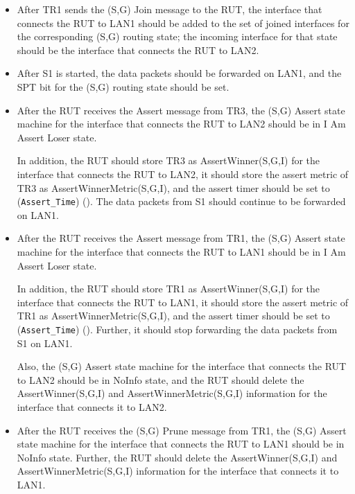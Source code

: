 \documentclass[11pt]{report}
\begin{document}
\begin{itemize}

  \item After TR1 sends the (S,G) Join message to the RUT, the interface that
  connects the RUT to LAN1 should be added to the set of joined interfaces for
  the corresponding (S,G) routing state; the incoming interface for that state
  should be the interface that connects the RUT to LAN2.

  \item After S1 is started, the data packets should be forwarded on LAN1,
  and the SPT bit for the (S,G) routing state should be set.

  \item After the RUT receives the Assert message from TR3, the (S,G)
  Assert state machine for the interface that connects the RUT to LAN2 should
  be in I Am Assert Loser state.

  In addition, the RUT should store TR3 as AssertWinner(S,G,I) for the
  interface that connects the RUT to LAN2, it should store the assert metric
  of TR3 as AssertWinnerMetric(S,G,I), and the assert timer should be set to
  (\verb=Assert_Time=) ({\PimsmAssertTime}).
  The data packets from S1 should continue to be forwarded on LAN1.

  \item After the RUT receives the Assert message from TR1, the (S,G)
  Assert state machine for the interface that connects the RUT to LAN1 should
  be in I Am Assert Loser state.

  In addition, the RUT should store TR1 as AssertWinner(S,G,I) for the
  interface that connects the RUT to LAN1, it should store the assert metric
  of TR1 as AssertWinnerMetric(S,G,I), and the assert timer should be set to
  (\verb=Assert_Time=) ({\PimsmAssertTime}).
  Further, it should stop forwarding the data packets from S1 on LAN1.

  Also, the (S,G) Assert state machine for the interface that connects the RUT
  to LAN2 should be in NoInfo state, and the RUT should delete the
  AssertWinner(S,G,I) and AssertWinnerMetric(S,G,I) information for the
  interface that connects it to LAN2.

  \item After the RUT receives the (S,G) Prune message from TR1, the (S,G)
  Assert state machine for the interface that connects the RUT to LAN1 should
  be in NoInfo state.
  Further, the RUT should delete the AssertWinner(S,G,I) and
  AssertWinnerMetric(S,G,I) information for the interface that connects it to
  LAN1.

\end{itemize}
\end{document}
